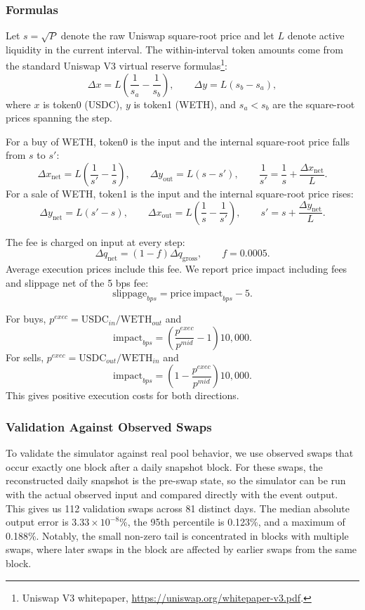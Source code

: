 \subsubsection{Formulas}
\label{subsubsec:m3-formulas}

Let $s=\sqrt{P}$ denote the raw Uniswap square-root price and let $L$ denote
active liquidity in the current interval.  The within-interval token amounts
come from the standard Uniswap V3 virtual reserve formulas\footnote{Uniswap V3
whitepaper, \url{https://uniswap.org/whitepaper-v3.pdf}.}:
\[
    \Delta x = L\left(\frac{1}{s_a} - \frac{1}{s_b}\right),
    \qquad
    \Delta y = L(s_b - s_a),
\]
where $x$ is token0 (USDC), $y$ is token1 (WETH), and $s_a<s_b$ are the
square-root prices spanning the step.

For a buy of WETH, token0 is the input and the internal square-root price falls
from $s$ to $s'$:
\[
    \Delta x_{\mathrm{net}}
    = L\left(\frac{1}{s'}-\frac{1}{s}\right),
    \qquad
    \Delta y_{\mathrm{out}} = L(s-s'),
    \qquad
    \frac{1}{s'} = \frac{1}{s} + \frac{\Delta x_{\mathrm{net}}}{L}.
\]
For a sale of WETH, token1 is the input and the internal square-root price
rises:
\[
    \Delta y_{\mathrm{net}} = L(s'-s),
    \qquad
    \Delta x_{\mathrm{out}}
    = L\left(\frac{1}{s}-\frac{1}{s'}\right),
    \qquad
    s' = s + \frac{\Delta y_{\mathrm{net}}}{L}.
\]

The fee is charged on input at every step:
\[
    \Delta q_{\mathrm{net}} = (1-f)\Delta q_{\mathrm{gross}},
    \qquad f = 0.0005.
\]
Average execution prices include this fee.  We report price impact including
fees and slippage net of the 5 bps fee:
\[
    \mathrm{slippage}_{bps}
    =
    \mathrm{price\ impact}_{bps}-5.
\]

For buys, $p^{exec}=\mathrm{USDC}_{in}/\mathrm{WETH}_{out}$ and
\[
    \mathrm{impact}_{bps}
    =
    \left(\frac{p^{exec}}{p^{mid}}-1\right)10{,}000.
\]
For sells, $p^{exec}=\mathrm{USDC}_{out}/\mathrm{WETH}_{in}$ and
\[
    \mathrm{impact}_{bps}
    =
    \left(1-\frac{p^{exec}}{p^{mid}}\right)10{,}000.
\]
This gives positive execution costs for both directions.

\subsubsection{Validation Against Observed Swaps}
\label{subsubsec:m3-validation}

To validate the simulator against real pool behavior, we use observed swaps
that occur exactly one block after a daily snapshot block.  For these swaps,
the reconstructed daily snapshot is the pre-swap state, so the simulator can be
run with the actual observed input and compared directly with the event output.
This gives us 112 validation swaps across 81 distinct days. The median absolute
output error is $3.33\times10^{-8}$\%, the 95th percentile is 0.123\%, and a
maximum of 0.188\%. Notably, the small non-zero tail is concentrated in blocks with
multiple swaps, where later swaps in the block are affected by earlier swaps
from the same block.

